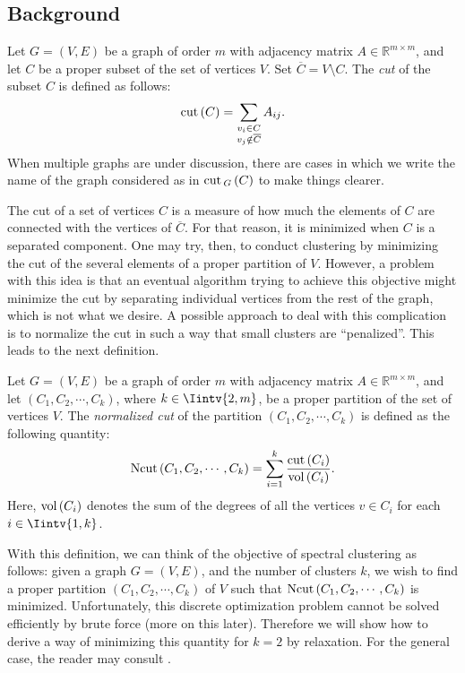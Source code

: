\subsection{Background}

\begin{definition}
   Let $G = (V,E)$ be a graph of order $m$ with adjacency matrix $A \in \mathbb R^{m \times m}$, and let $C$ be a proper subset of the set of vertices $V$. 
   Set $\overline{C} = V \setminus C$.
   The \textit{cut} of the subset $C$ is defined as follows:
   \begin{equation}
      \operatorname{cut\,} (C) = \sum_{\substack{v_i \in C \\ v_j \notin \overline C }} A_{ij}.
   \end{equation}
   When multiple graphs are under discussion, there are cases in which we write the name of the graph considered as in $\operatorname{cut\,} _G \,(C)$ to make things clearer.
\end{definition}

The cut of a set of vertices $C$ is a measure of how much the elements of $C$ are connected with the vertices of $\overline C$.
For that reason, it is minimized when $C$ is a separated component. 
One may try, then, to conduct clustering by minimizing the cut of the several elements of a proper partition of $V$.
However, a problem with this idea is that an eventual algorithm trying to achieve this objective might minimize the cut by separating individual vertices from the rest of the graph, which is not what we desire.
A possible approach to deal with this complication is to normalize the cut in such a way that small clusters are ``penalized''.
This leads to the next definition.

\begin{definition}
   Let $G = (V,E)$ be a graph of order $m$ with adjacency matrix $A \in \mathbb R^{m \times m}$, and let $(C_1, C_2, \cdots, C_k)$, where $k \in \Iintv{2,m}$, be a proper partition of the set of vertices $V$.
   The \textit{normalized cut} of the partition $(C_1, C_2, \cdots, C_k)$ is defined as the following quantity:
   \begin{equation}
      \operatorname*{Ncut\,} (C_1, C_2, \cdots, C_k) = \sum _{i = 1}^k \frac{\operatorname{cut\,} (C_i)}{\operatorname*{vol\,}(C_i)}.
   \end{equation}
   Here, $\operatorname*{vol\,} (C_i)$ denotes the sum of the degrees of all the vertices $v \in C_i$ for each $i \in \Iintv{1,k}$.
\end{definition}

With this definition, we can think of the objective of spectral clustering as follows: given a graph $G=(V,E)$, and the number of clusters $k$, we wish to find a proper partition $(C_1, C_2, \cdots, C_k)$ of $V$ such that $\operatorname*{Ncut\,} (C_1, C_2, \cdots, C_k)$ is minimized. Unfortunately, this discrete optimization problem cannot be solved efficiently by brute force (more on this later). Therefore we will show how to derive a way of minimizing this quantity for $k = 2$ by relaxation. For the general case, the reader may consult \cite{tutorial}.

